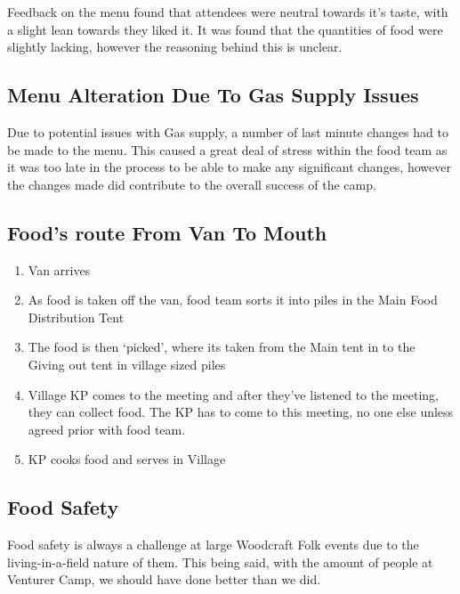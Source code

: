 Feedback on the menu found that attendees were neutral towards it's taste, with a slight lean towards they liked it. It was found that the quantities of food were slightly lacking, however the reasoning behind this is unclear. 

\subsection{Menu Alteration Due To Gas Supply Issues}
Due to potential issues with Gas supply, a number of last minute changes had to be made to the menu. This caused a great deal of stress within the food team as it was too late in the process to be able to make any significant changes, however the changes made did contribute to the overall success of the camp.
\subsection{Food's route From Van To Mouth}
\begin{enumerate}
    \item Van arrives
    \item As food is taken off the van, food team sorts it into piles in the Main Food Distribution Tent
    \item The food is then `picked', where its taken from the Main tent in to the Giving out tent in village sized piles
    \item Village KP comes to the meeting and after they've listened to the meeting, they can collect food. The KP has to come to this meeting, no one else unless agreed prior with food team.
    \item KP cooks food and serves in Village
\end{enumerate}

\subsection{Food Safety}
Food safety is always a challenge at large Woodcraft Folk events due to the living-in-a-field nature of them. This being said, with the amount of people at Venturer Camp, we should have done better than we did. \\

